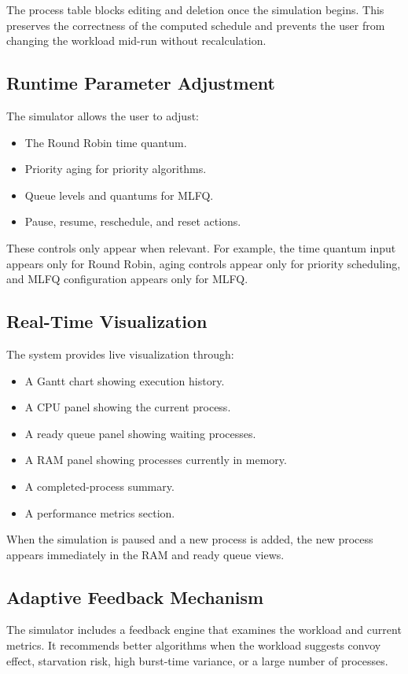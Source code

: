\documentclass[12pt]{article}
\begin{document}
The process table blocks editing and deletion once the simulation begins. This preserves the correctness of the computed schedule and prevents the user from changing the workload mid-run without recalculation.

\subsection{Runtime Parameter Adjustment}
The simulator allows the user to adjust:
\begin{itemize}[leftmargin=*]
    \item The Round Robin time quantum.
    \item Priority aging for priority algorithms.
    \item Queue levels and quantums for MLFQ.
    \item Pause, resume, reschedule, and reset actions.
\end{itemize}

These controls only appear when relevant. For example, the time quantum input appears only for Round Robin, aging controls appear only for priority scheduling, and MLFQ configuration appears only for MLFQ.

\subsection{Real-Time Visualization}
The system provides live visualization through:
\begin{itemize}[leftmargin=*]
    \item A Gantt chart showing execution history.
    \item A CPU panel showing the current process.
    \item A ready queue panel showing waiting processes.
    \item A RAM panel showing processes currently in memory.
    \item A completed-process summary.
    \item A performance metrics section.
\end{itemize}

When the simulation is paused and a new process is added, the new process appears immediately in the RAM and ready queue views.

\subsection{Adaptive Feedback Mechanism}
The simulator includes a feedback engine that examines the workload and current metrics. It recommends better algorithms when the workload suggests convoy effect, starvation risk, high burst-time variance, or a large number of processes.
\end{document}
